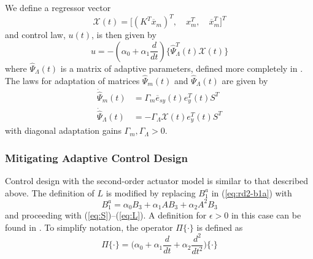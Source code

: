 \documentclass[english]{ifacconf}
\begin{document}
We define a regressor vector 
\begin{equation}
\mathcal{X}(t) = \big[ (K^T \overline{x}_m)^T,\quad x_m^T,\quad \overline{x}_m^T \big]^T
\end{equation}
and control law, $u(t)$, is then given by
\begin{equation}
u = - (\alpha_0 + \alpha_1 \frac{d}{dt}) \big \{ \hat{\Psi}_{\Lambda}^T (t) \mathcal{X}(t) \big\}	
\end{equation}
where $\hat{\Psi}_{\Lambda}(t)$ is a matrix of adaptive parameters, defined more completely in \cite{qu2016adaptive}. The laws for adaptation of matrices $\hat{\Psi}_m(t)$ and $\hat{\Psi}_{\Lambda}(t)$ are given by
\begin{equation}
\begin{aligned}
	\dot{\hat{\Psi}}_m(t) &= \Gamma_{m} \overline{e}_{sy}(t) e_y^T(t) S^T \\
	\dot{\hat{\Psi}}_{\Lambda}(t) &= -\Gamma_{\Lambda} \mathcal{X}(t) e_y^T (t) S^T
\end{aligned} \label{eq:rd2-adaptation}
\end{equation}
with diagonal adaptation gains $\Gamma_{m}, \Gamma_{\Lambda} > 0$.

\subsubsection{Mitigating Adaptive Control Design}
Control design with the second-order actuator model is similar to that described above. The definition of $L$ is modified by replacing $B_1^a$ in (\ref{eq:rd2-b1a}) with
\begin{equation}
B_1^a = \alpha_0 B_3 + \alpha_1 A B_3 + \alpha_2 A^2 B_3 \label{eq:rd3-b1a}
\end{equation}
and proceeding with (\ref{eq:S})--(\ref{eq:L}). A definition for $\epsilon>0$ in this case can be found in \cite{qu2016phd}. To simplify notation, the operator $\Pi \{\cdot \}$ is defined as
\begin{equation}
\Pi \{ \cdot \} = \big( \alpha_0 + \alpha_1 \frac{d}{dt} + \alpha_2 \frac{d^2}{dt^2} \big) \{ \cdot \}
\end{equation}
\end{document}

